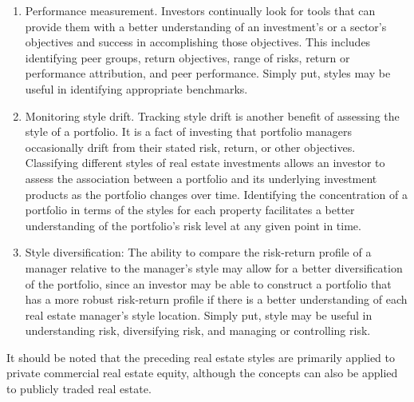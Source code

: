 \documentclass[11pt]{article}
\begin{document}
\begin{enumerate}
  \item Performance measurement. Investors continually look for tools that can provide them with a better understanding of an investment's or a sector's objectives and success in accomplishing those objectives. This includes identifying peer groups, return objectives, range of risks, return or performance attribution, and peer performance. Simply put, styles may be useful in identifying appropriate benchmarks.

  \item Monitoring style drift. Tracking style drift is another benefit of assessing the style of a portfolio. It is a fact of investing that portfolio managers occasionally drift from their stated risk, return, or other objectives. Classifying different styles of real estate investments allows an investor to assess the association between a portfolio and its underlying investment products as the portfolio changes over time. Identifying the concentration of a portfolio in terms of the styles for each property facilitates a better understanding of the portfolio's risk level at any given point in time.

  \item Style diversification: The ability to compare the risk-return profile of a manager relative to the manager's style may allow for a better diversification of the portfolio, since an investor may be able to construct a portfolio that has a more robust risk-return profile if there is a better understanding of each real estate manager's style location. Simply put, style may be useful in understanding risk, diversifying risk, and managing or controlling risk.

\end{enumerate}

It should be noted that the preceding real estate styles are primarily applied to private commercial real estate equity, although the concepts can also be applied to publicly traded real estate.
\end{document}
